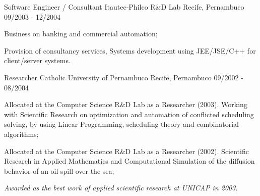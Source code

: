 \begin{cventries}
\cventry
{Software Engineer / Consultant}
{Itautec-Philco R\&D Lab}
{Recife, Pernambuco}
{09/2003 - 12/2004}
{
\begin{cvitems}
\item Business on banking and commercial automation;
\item Provision of consultancy services, Systems development using JEE/JSE/C++ for client/server systems.
\end{cvitems}
}

\cventry
{Researcher}
{Catholic University of Pernambuco}
{Recife, Pernambuco}
{09/2002 - 08/2004}
{
\begin{cvitems}
\item Allocated at the Computer Science R\&D Lab as a Researcher (2003). Working with Scientific Research on optimization and automation of conflicted scheduling solving, by using Linear Programming, scheduling theory and combinatorial algorithms;
\item Allocated at the Computer Science R\&D Lab as a Researcher (2002). Scientific Research in Applied Mathematics and Computational Simulation of the diffusion behavior of an oil spill over the sea;
\item \textit{Awarded as the best work of applied scientific research at UNICAP in 2003}.
\end{cvitems}
}

\end{cventries}

\pagebreak
